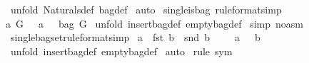 \begin{isabellebody}
%
\isadelimproof
%
\endisadelimproof
%
\isatagproof
{}\isamarkupfalse%
\ {\isacharparenleft}unfold\ Naturals{\isacharunderscore}{}{\isacharunderscore}def\ bag{\isacharunderscore}def{\isacharparenright}\isanewline
{}\isamarkupfalse%
\ auto\isanewline
{}\isamarkupfalse%
%
\endisatagproof
{\isafoldproof}%
%
\isadelimproof
\isanewline
%
\endisadelimproof
\isanewline
{}\isamarkupfalse%
\ single{\isacharunderscore}is{\isacharunderscore}bag{}\ {\isacharbrackleft}rule{\isacharunderscore}format{\isacharcomma}simp{\isacharbrackright}{\isacharcolon}\ \isanewline
{\isachardoublequoteopen}{\isacharparenleft}a{\isacharcolon}\ G{\isacharparenright}\ {\isacharminus}{\isacharminus}{\isachargreater}\ {\isacharparenleft}{\isacharpercent}{\isacharbrackleft}\ a\ {\isacharpercent}{\isacharbrackright}\ {\isacharcolon}\ {\isacharparenleft}bag\ G{\isacharparenright}{\isacharparenright}{\isachardoublequoteclose}\isanewline
%
\isadelimproof
%
\endisadelimproof
%
\isatagproof
{}\isamarkupfalse%
\ {\isacharparenleft}unfold\ insertbag{\isacharunderscore}def\ emptybag{\isacharunderscore}def{\isacharparenright}\isanewline
{}\isamarkupfalse%
\ {\isacharparenleft}simp\ {\isacharparenleft}no{\isacharunderscore}asm{\isacharparenright}{\isacharparenright}\isanewline
{}\isamarkupfalse%
%
\endisatagproof
{\isafoldproof}%
%
\isadelimproof
\isanewline
%
\endisadelimproof
\isanewline
\isanewline
{}\isamarkupfalse%
\ single{\isacharunderscore}bagset{\isacharbrackleft}rule{\isacharunderscore}format{\isacharcomma}simp{\isacharbrackright}{\isacharcolon}\ \isanewline
{\isachardoublequoteopen}{\isacharparenleft}a\ {\isacharequal}\ {\isacharparenleft}fst\ b{\isacharparenright}{\isacharparenright}\ {\isacharminus}{\isacharminus}{\isachargreater}\ {\isacharparenleft}{\isacharparenleft}snd\ b{\isacharparenright}\ {\isacharequal}\ {}{\isacharparenright}\ {\isacharminus}{\isacharminus}{\isachargreater}\ {\isacharparenleft}{\isacharpercent}{\isacharbrackleft}\ a\ {\isacharpercent}{\isacharbrackright}\ {\isacharequal}\ {\isacharbraceleft}b{\isacharbraceright}{\isacharparenright}{\isachardoublequoteclose}\isanewline
%
\isadelimproof
%
\endisadelimproof
%
\isatagproof
{}\isamarkupfalse%
\ {\isacharparenleft}unfold\ insertbag{\isacharunderscore}def\ emptybag{\isacharunderscore}def{\isacharparenright}\isanewline
{}\isamarkupfalse%
\ auto\isanewline
{}\isamarkupfalse%
\ {\isacharparenleft}rule\ sym{\isacharparenright}\isanewline

\end{isabellebody}
